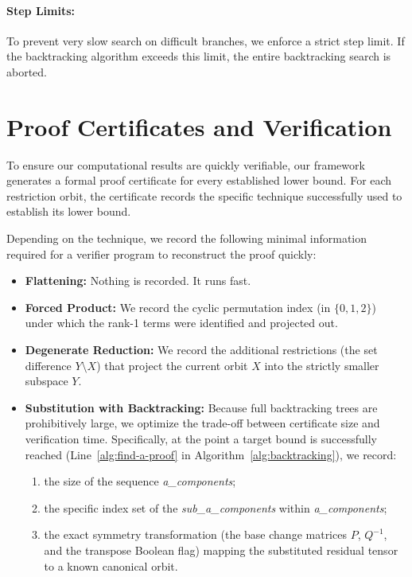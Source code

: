 \documentclass[11pt]{article}
\begin{document}
\paragraph{Step Limits:} To prevent very slow search on difficult branches, we enforce a strict step limit. If the backtracking algorithm exceeds this limit, the entire backtracking search is aborted.
\section{Proof Certificates and Verification}\label{sec:certificates}

To ensure our computational results are quickly verifiable, our framework generates a formal proof certificate for every established lower bound. For each restriction orbit, the certificate records the specific technique successfully used to establish its lower bound.

Depending on the technique, we record the following minimal information required for a verifier program to reconstruct the proof quickly:
\begin{itemize}
  \item \textbf{Flattening:} Nothing is recorded. It runs fast.
  \item \textbf{Forced Product:} We record the cyclic permutation index (in $\{0,1,2\}$) under which the rank-1 terms were identified and projected out.
  \item \textbf{Degenerate Reduction:} We record the additional restrictions (the set difference $Y \setminus X$) that project the current orbit $X$ into the strictly smaller subspace $Y$.
  \item \textbf{Substitution with Backtracking:} Because full backtracking trees are prohibitively large, we optimize the trade-off between certificate size and verification time. Specifically, at the point a target bound is successfully reached (Line~\ref{alg:find-a-proof} in Algorithm~\ref{alg:backtracking}), we record:
        \begin{enumerate}
          \item the size of the sequence \textit{a\_components};
          \item the specific index set of the \textit{sub\_a\_components} within \textit{a\_components};
          \item the exact symmetry transformation (the base change matrices $P$, $Q^{-1}$, and the transpose Boolean flag) mapping the substituted residual tensor to a known canonical orbit.
        \end{enumerate}
\end{itemize}
\end{document}
